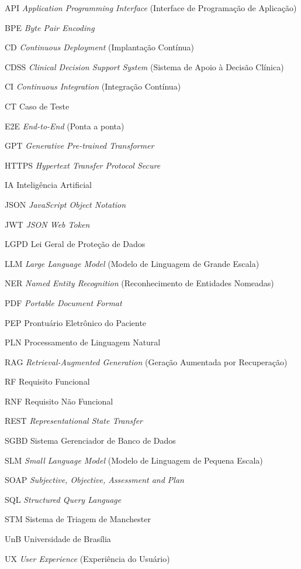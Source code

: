 \begin{siglas}
  \item[API] \textit{Application Programming Interface} (Interface de Programação de Aplicação)
  \item[BPE] \textit{Byte Pair Encoding}
  \item[CD] \textit{Continuous Deployment} (Implantação Contínua)
  \item[CDSS] \textit{Clinical Decision Support System} (Sistema de Apoio à Decisão Clínica)
  \item[CI] \textit{Continuous Integration} (Integração Contínua)
  \item[CT] Caso de Teste
  \item[E2E] \textit{End-to-End} (Ponta a ponta)
  \item[GPT] \textit{Generative Pre-trained Transformer}
  \item[HTTPS] \textit{Hypertext Transfer Protocol Secure}
  \item[IA] Inteligência Artificial
  \item[JSON] \textit{JavaScript Object Notation}
  \item[JWT] \textit{JSON Web Token}
  \item[LGPD] Lei Geral de Proteção de Dados
  \item[LLM] \textit{Large Language Model} (Modelo de Linguagem de Grande Escala)
  \item[NER] \textit{Named Entity Recognition} (Reconhecimento de Entidades Nomeadas)
  \item[PDF] \textit{Portable Document Format}
  \item[PEP] Prontuário Eletrônico do Paciente
  \item[PLN] Processamento de Linguagem Natural
  \item[RAG] \textit{Retrieval-Augmented Generation} (Geração Aumentada por Recuperação)
  \item[RF] Requisito Funcional
  \item[RNF] Requisito Não Funcional
  \item[REST] \textit{Representational State Transfer}
  \item[SGBD] Sistema Gerenciador de Banco de Dados
  \item[SLM] \textit{Small Language Model} (Modelo de Linguagem de Pequena Escala)
  \item[SOAP] \textit{Subjective, Objective, Assessment and Plan}
  \item[SQL] \textit{Structured Query Language}
  \item[STM] Sistema de Triagem de Manchester
  \item[UnB] Universidade de Brasília
  \item[UX] \textit{User Experience} (Experiência do Usuário)
\end{siglas}
